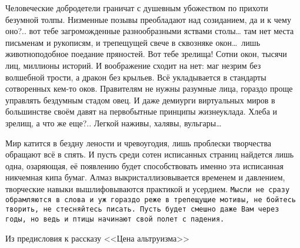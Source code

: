 Человеческие добродетели граничат с душевным убожеством по прихоти безумной 
толпы. Низменные позывы преобладают над созиданием, да и к чему оно?.. вот тебе 
загроможденные разнообразными яствами столы… там нет места письменам и 
рукописям, и трепещущей свече в сквозняке окон\dots\ лишь животноподобное 
поедание пряностей. Вот тебе зрелища! Сотни окон, тысячи лиц, миллионы 
историй. И воображение сходит на нет: маг незрим без волшебной трости, а 
дракон без крыльев. Всё укладывается в стандарты сотворенных кем-то оков. 
Правителям не нужны разумные лица, гораздо проще управлять бездумным стадом 
овец. И даже демиурги виртуальных миров в большинстве своём давят на первобытные 
принципы жизнеуклада. Хлеба и зрелищ, а что же еще?.. Легкой наживы, 
халявы, вульгары\dots

\vspace{8mm}
Мир катится в бездну лености и чревоугодия, лишь проблески творчества обращают 
всё в спять. И пусть среди сотен исписанных страниц найдется лишь одна, 
озаряющая, её появлению будет способствовать именно эта исписанная никчемная 
кипа бумаг. Алмаз выкристаллизовывается временем и давлением, творческие навыки 
вышлифовываются практикой и усердием. \texttt{Мысли не сразу обрамляются в слова 
и уж гораздо реже в трепещущие мотивы, не бойтесь творить, не стесняйтесь 
писать. Пусть будет смешно даже Вам через годы, но ведь и птицы начинают свой 
полет с падения.}

\vspace{24mm}
\noindent Из предисловия к рассказу <<Цена альтруизма>>\\
\noindent {}
